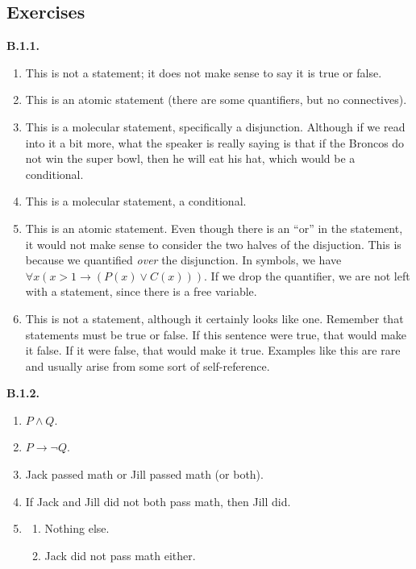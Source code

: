 \documentclass[10pt,]{book}
\theoremstyle{plain}
\theoremstyle{definition}
\theoremstyle{definition}
\theoremstyle{definition}
\theoremstyle{definition}
\numberwithin{equation}{chapter}
\def\imp{\rightarrow}
\begin{document}
\subsection*{ Exercises}
\noindent\textbf{B.1.1.} \hypertarget{p-1474}{}%
\leavevmode%
\begin{enumerate}[label=(\alph*)]
\item\hypertarget{li-329}{}This is not a statement; it does not make sense to say it is true or false.%
\item\hypertarget{li-330}{}This is an atomic statement (there are some quantifiers, but no connectives).%
\item\hypertarget{li-331}{}This is a molecular statement, specifically a disjunction.  Although if we read into it a bit more, what the speaker is really saying is that if the Broncos do not win the super bowl, then he will eat his hat, which would be a conditional.%
\item\hypertarget{li-332}{}This is a molecular statement, a conditional.%
\item\hypertarget{li-333}{}This is an atomic statement.  Even though there is an ``or'' in the statement, it would not make sense to consider the two halves of the disjuction.  This is because we quantified \emph{over} the disjunction.  In symbols, we have \(\forall x (x > 1 \imp (P(x) \vee C(x)))\).  If we drop the quantifier, we are not left with a statement, since there is a free variable.%
\item\hypertarget{li-334}{}This is not a statement, although it certainly looks like one.  Remember that statements must be true or false.  If this sentence were true, that would make it false.  If it were false, that would make it true.  Examples like this are rare and usually arise from some sort of self-reference.%
\end{enumerate}
%
\par\smallskip
\noindent\textbf{B.1.2.} \hypertarget{p-1481}{}%
\leavevmode%
\begin{enumerate}[label=(\alph*)]
\item\hypertarget{li-342}{}\(P \wedge Q\).%
\item\hypertarget{li-343}{}\(P \imp \neg Q\).%
\item\hypertarget{li-344}{}\hypertarget{p-1482}{}%
Jack passed math or Jill passed math (or both).%
\item\hypertarget{li-345}{}\hypertarget{p-1483}{}%
If Jack and Jill did not both pass math, then Jill did.%
\item\hypertarget{li-346}{}\hypertarget{p-1484}{}%
%
\begin{enumerate}[label=\roman*.]
\item\hypertarget{li-347}{}Nothing else.%
\item\hypertarget{li-348}{}Jack did not pass math either.%
\end{enumerate}
%
\end{enumerate}
\end{document}
